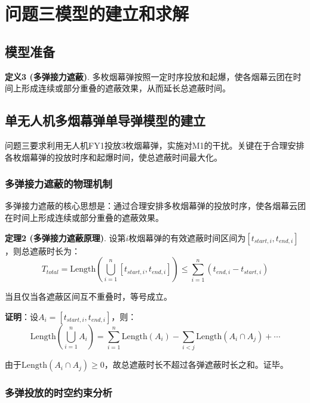 \documentclass[12pt,a4paper]{article}
\begin{document}
\section{问题三模型的建立和求解}

\subsection{模型准备}

\noindent\textbf{定义3 (多弹接力遮蔽)}. 多枚烟幕弹按照一定时序投放和起爆，使各烟幕云团在时间上形成连续或部分重叠的遮蔽效果，从而延长总遮蔽时间。

\subsection{单无人机多烟幕弹单导弹模型的建立}

\indent 问题三要求利用无人机FY1投放3枚烟幕弹，实施对M1的干扰。关键在于合理安排各枚烟幕弹的投放时序和起爆时间，使总遮蔽时间最大化。

\subsubsection{多弹接力遮蔽的物理机制}

\indent 多弹接力遮蔽的核心思想是：通过合理安排多枚烟幕弹的投放时序，使各烟幕云团在时间上形成连续或部分重叠的遮蔽效果。

\noindent\textbf{定理2 (多弹接力遮蔽原理)}. 设第$i$枚烟幕弹的有效遮蔽时间区间为$[t_{start,i}, t_{end,i}]$，则总遮蔽时长为：
\begin{equation}
T_{total} = \text{Length}\left(\bigcup_{i=1}^{n} [t_{start,i}, t_{end,i}]\right) \leq \sum_{i=1}^{n} (t_{end,i} - t_{start,i})
\end{equation}

\indent 当且仅当各遮蔽区间互不重叠时，等号成立。

\noindent\textbf{证明}：设$A_i = [t_{start,i}, t_{end,i}]$，则：
\begin{equation}
\text{Length}\left(\bigcup_{i=1}^{n} A_i\right) = \sum_{i=1}^{n} \text{Length}(A_i) - \sum_{i<j} \text{Length}(A_i \cap A_j) + \cdots
\end{equation}

\indent 由于$\text{Length}(A_i \cap A_j) \geq 0$，故总遮蔽时长不超过各弹遮蔽时长之和。证毕。

\subsubsection{多弹投放的时空约束分析}
\end{document}
